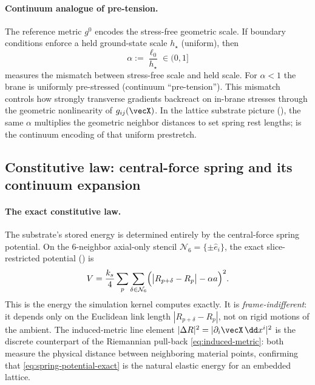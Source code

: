 \paragraph{Continuum analogue of pre-tension.}
The reference metric $g^0$ encodes the stress-free geometric scale.
If boundary conditions enforce a held ground-state scale $h_\star$ (uniform), then
\begin{equation}
  \alpha:=\frac{\ell_0}{h_\star}\in(0,1]
  \label{eq:alpha-def}
\end{equation}
measures the mismatch between stress-free scale and held scale.
For $\alpha<1$ the brane is uniformly pre-stressed (continuum ``pre-tension''). This mismatch controls how strongly
transverse gradients backreact on in-brane stresses through the geometric nonlinearity of $g_{ij}(\vecX)$.
In the lattice substrate picture (), the same $\alpha$ multiplies the geometric
neighbor distances to set spring rest lengths;  is the continuum encoding of that uniform prestretch.

\subsection{Constitutive law: central-force spring and its continuum expansion}
\label{subsec:constitutive-law}

\paragraph{The exact constitutive law.}
The substrate's stored energy is determined entirely by the central-force spring potential.
On the 6-neighbor axial-only stencil $\mathcal{N}_6 = \{\pm\hat{e}_i\}$,
the exact slice-restricted potential () is
\begin{equation}
  V = \frac{k_s}{4}\sum_{p}\sum_{\delta\in\mathcal{N}_6}
        \Bigl(\bigl|R_{p+\delta} - R_p\bigr| - \alpha a\Bigr)^2.
  \label{eq:spring-potential-exact}
\end{equation}
This is the energy the simulation kernel computes exactly.
It is \emph{frame-indifferent}: it depends only on the Euclidean link length $|R_{p+\delta}-R_p|$,
not on rigid motions of the ambient.
The induced-metric line element $|\Delta R|^2 = |\partial_i\vecX\,\dd x^i|^2$ is the discrete
counterpart of the Riemannian pull-back \eqref{eq:induced-metric}: both measure the physical
distance between neighboring material points, confirming that \eqref{eq:spring-potential-exact}
is the natural elastic energy for an embedded lattice.

